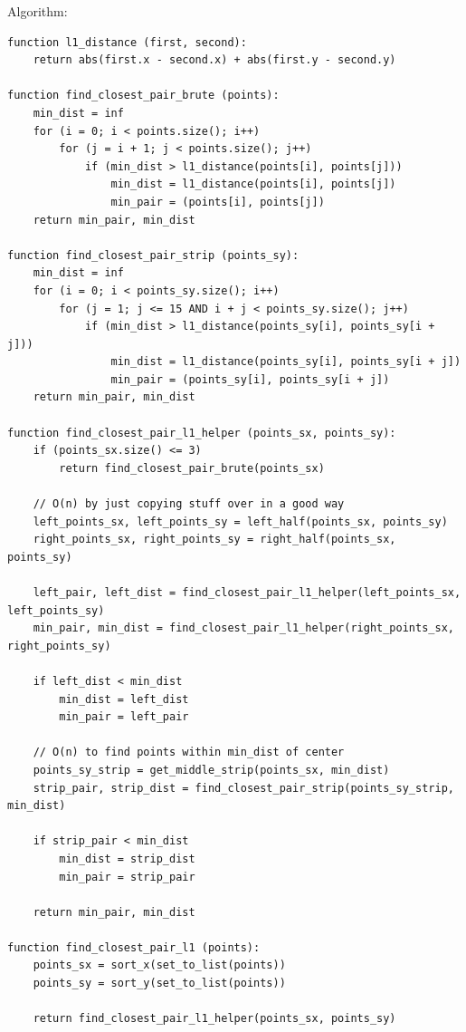 \documentclass[11pt, oneside]{article}
\begin{document}
Algorithm: 
\begin{lstlisting}
function l1_distance (first, second):
    return abs(first.x - second.x) + abs(first.y - second.y)

function find_closest_pair_brute (points):
    min_dist = inf
    for (i = 0; i < points.size(); i++)
        for (j = i + 1; j < points.size(); j++)
            if (min_dist > l1_distance(points[i], points[j]))
                min_dist = l1_distance(points[i], points[j])
                min_pair = (points[i], points[j])
    return min_pair, min_dist

function find_closest_pair_strip (points_sy):
    min_dist = inf
    for (i = 0; i < points_sy.size(); i++)
        for (j = 1; j <= 15 AND i + j < points_sy.size(); j++)
            if (min_dist > l1_distance(points_sy[i], points_sy[i + j]))
                min_dist = l1_distance(points_sy[i], points_sy[i + j])
                min_pair = (points_sy[i], points_sy[i + j])
    return min_pair, min_dist

function find_closest_pair_l1_helper (points_sx, points_sy):
    if (points_sx.size() <= 3)
        return find_closest_pair_brute(points_sx)

    // O(n) by just copying stuff over in a good way
    left_points_sx, left_points_sy = left_half(points_sx, points_sy) 
    right_points_sx, right_points_sy = right_half(points_sx, points_sy)

    left_pair, left_dist = find_closest_pair_l1_helper(left_points_sx, left_points_sy)
    min_pair, min_dist = find_closest_pair_l1_helper(right_points_sx, right_points_sy)

    if left_dist < min_dist
        min_dist = left_dist
        min_pair = left_pair

    // O(n) to find points within min_dist of center
    points_sy_strip = get_middle_strip(points_sx, min_dist)
    strip_pair, strip_dist = find_closest_pair_strip(points_sy_strip, min_dist)

    if strip_pair < min_dist
        min_dist = strip_dist
        min_pair = strip_pair

    return min_pair, min_dist

function find_closest_pair_l1 (points):
    points_sx = sort_x(set_to_list(points))
    points_sy = sort_y(set_to_list(points))

    return find_closest_pair_l1_helper(points_sx, points_sy)
\end{lstlisting}

\clearpage
\end{document}
